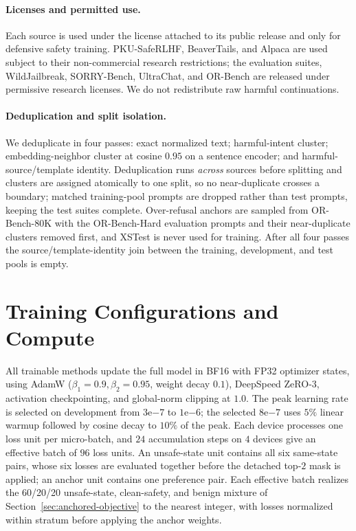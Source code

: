 \documentclass[11pt]{article}
\begin{document}
\paragraph{Licenses and permitted use.}
Each source is used under the license attached to its public release and only
for defensive safety training. PKU-SafeRLHF, BeaverTails, and Alpaca are
used subject to their non-commercial research restrictions; the evaluation
suites, WildJailbreak,
SORRY-Bench, UltraChat, and OR-Bench are released under permissive research
licenses. We do not redistribute raw harmful continuations.

\paragraph{Deduplication and split isolation.}
We deduplicate in four passes: exact normalized text; harmful-intent cluster;
embedding-neighbor cluster at cosine \(0.95\) on a sentence encoder; and
harmful-source/template identity. Deduplication runs \emph{across} sources before
splitting and clusters are assigned atomically to one split, so no near-duplicate
crosses a boundary; matched training-pool prompts are dropped rather than test
prompts, keeping the test suites complete. Over-refusal anchors are sampled from
OR-Bench-80K with the OR-Bench-Hard evaluation prompts and their near-duplicate
clusters removed first, and XSTest is never used for training. After all four
passes the source/template-identity join between the training, development, and
test pools is empty.

\section{Training Configurations and Compute}
\label{app:training}

All trainable methods update the full model in BF16 with FP32 optimizer states,
using AdamW (\(\beta_1=0.9,\beta_2=0.95\), weight decay \(0.1\)), DeepSpeed
ZeRO-3, activation checkpointing, and global-norm clipping at \(1.0\). The peak
learning rate is selected on development from
\(3\mathrm{e}{-7}\) to \(1\mathrm{e}{-6}\); the selected
\(8\mathrm{e}{-7}\) uses \(5\%\) linear warmup followed by cosine decay to
\(10\%\) of the peak. Each device processes one loss unit per micro-batch, and
\(24\) accumulation steps on \(4\) devices give an effective batch of \(96\)
loss units. An unsafe-state unit contains all six same-state pairs, whose six
losses are evaluated together before the detached top-\(2\) mask is applied;
an anchor unit contains one preference pair. Each effective batch realizes the
60/20/20 unsafe-state, clean-safety, and benign mixture of
Section~\ref{sec:anchored-objective} to the nearest integer, with losses
normalized within stratum before applying the anchor weights.
\end{document}
